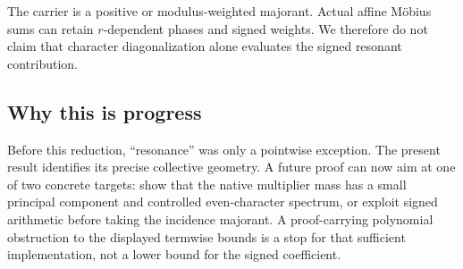 The carrier is a positive or modulus-weighted majorant.  Actual
affine M\"obius sums can retain \(r\)-dependent phases and signed
weights.  We therefore do not claim that character diagonalization
alone evaluates the signed resonant contribution.

\subsection{Why this is progress}

Before this reduction, ``resonance'' was only a pointwise exception.
The present result identifies its precise collective geometry.  A
future proof can now aim at one of two concrete targets: show that
the native multiplier mass has a small principal component and
controlled even-character spectrum, or exploit signed arithmetic
before taking the incidence majorant.  A proof-carrying polynomial
obstruction to the displayed termwise bounds is a stop for that
sufficient implementation, not a lower bound for the signed
coefficient.
